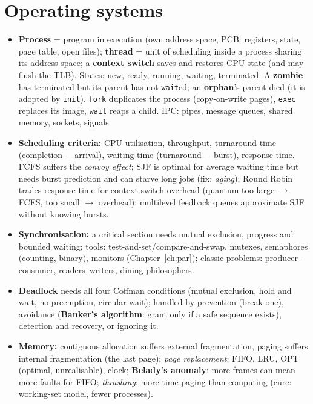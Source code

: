 \documentclass[10pt,a4paper,openany,oneside]{report}
\newcommand{\prio}[1]{\texorpdfstring{\ifcase#1\or{\color{gold}\ding{72}}\or{\color{gold}\ding{72}\ding{72}}\or{\color{gold}\ding{72}\ding{72}\ding{72}}\fi}{}}
\begin{document}
\section{Operating systems \prio{3}}
\begin{mustbox}
\begin{itemize}[nosep]
\item \textbf{Process} = program in execution (own address space, PCB: registers, state, page table, open files); \textbf{thread} = unit of scheduling inside a process sharing its address space; a \textbf{context switch} saves and restores CPU state (and may flush the TLB). States: new, ready, running, waiting, terminated. A \textbf{zombie} has terminated but its parent has not \texttt{wait}ed; an \textbf{orphan}'s parent died (it is adopted by \texttt{init}). \texttt{fork} duplicates the process (copy-on-write pages), \texttt{exec} replaces its image, \texttt{wait} reaps a child. IPC: pipes, message queues, shared memory, sockets, signals.
\item \textbf{Scheduling criteria:} CPU utilisation, throughput, turnaround time (completion $-$ arrival), waiting time (turnaround $-$ burst), response time. FCFS suffers the \emph{convoy effect}; SJF is optimal for average waiting time but needs burst prediction and can starve long jobs (fix: \emph{aging}); Round Robin trades response time for context-switch overhead (quantum too large $\to$ FCFS, too small $\to$ overhead); multilevel feedback queues approximate SJF without knowing bursts.
\item \textbf{Synchronisation:} a critical section needs mutual exclusion, progress and bounded waiting; tools: test-and-set/compare-and-swap, mutexes, semaphores (counting, binary), monitors (Chapter~\ref{ch:par}); classic problems: producer--consumer, readers--writers, dining philosophers.
\item \textbf{Deadlock} needs all four Coffman conditions (mutual exclusion, hold and wait, no preemption, circular wait); handled by prevention (break one), avoidance (\textbf{Banker's algorithm}: grant only if a safe sequence exists), detection and recovery, or ignoring it.
\item \textbf{Memory:} contiguous allocation suffers external fragmentation, paging suffers internal fragmentation (the last page); \emph{page replacement}: FIFO, LRU, OPT (optimal, unrealisable), clock; \textbf{Belady's anomaly}: more frames can mean more faults for FIFO; \emph{thrashing}: more time paging than computing (cure: working-set model, fewer processes).
\end{itemize}
\end{mustbox}
\end{document}
